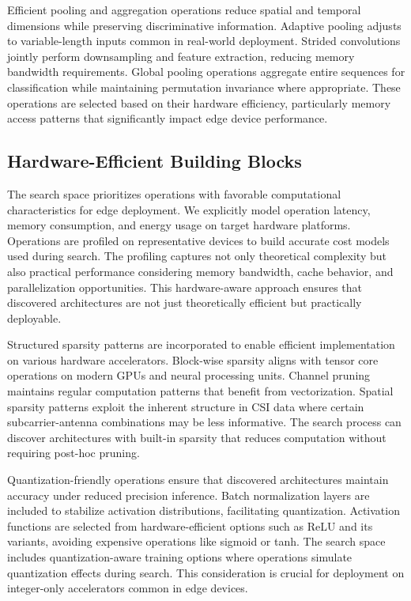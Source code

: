 \documentclass[journal]{IEEEtran}
\begin{document}
Efficient pooling and aggregation operations reduce spatial and temporal dimensions while preserving discriminative information. Adaptive pooling adjusts to variable-length inputs common in real-world deployment. Strided convolutions jointly perform downsampling and feature extraction, reducing memory bandwidth requirements. Global pooling operations aggregate entire sequences for classification while maintaining permutation invariance where appropriate. These operations are selected based on their hardware efficiency, particularly memory access patterns that significantly impact edge device performance.

\subsection{Hardware-Efficient Building Blocks}

The search space prioritizes operations with favorable computational characteristics for edge deployment. We explicitly model operation latency, memory consumption, and energy usage on target hardware platforms. Operations are profiled on representative devices to build accurate cost models used during search. The profiling captures not only theoretical complexity but also practical performance considering memory bandwidth, cache behavior, and parallelization opportunities. This hardware-aware approach ensures that discovered architectures are not just theoretically efficient but practically deployable.

Structured sparsity patterns are incorporated to enable efficient implementation on various hardware accelerators. Block-wise sparsity aligns with tensor core operations on modern GPUs and neural processing units. Channel pruning maintains regular computation patterns that benefit from vectorization. Spatial sparsity patterns exploit the inherent structure in CSI data where certain subcarrier-antenna combinations may be less informative. The search process can discover architectures with built-in sparsity that reduces computation without requiring post-hoc pruning.

Quantization-friendly operations ensure that discovered architectures maintain accuracy under reduced precision inference. Batch normalization layers are included to stabilize activation distributions, facilitating quantization. Activation functions are selected from hardware-efficient options such as ReLU and its variants, avoiding expensive operations like sigmoid or tanh. The search space includes quantization-aware training options where operations simulate quantization effects during search. This consideration is crucial for deployment on integer-only accelerators common in edge devices.
\end{document}
